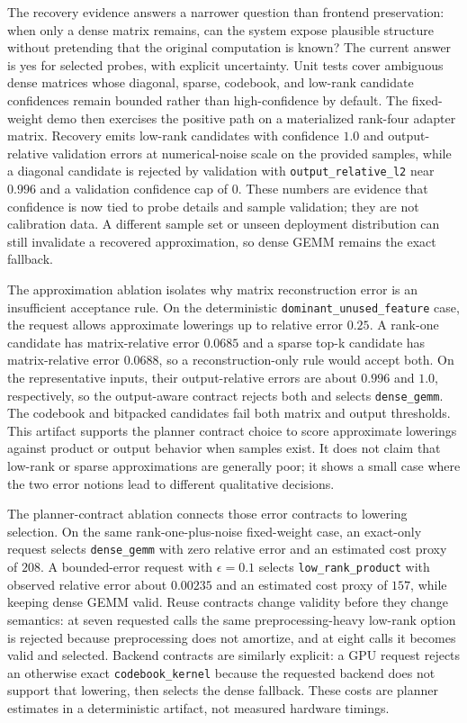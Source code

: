\documentclass[11pt]{article}
\begin{document}
The recovery evidence answers a narrower question than frontend preservation:
when only a dense matrix remains, can the system expose plausible structure
without pretending that the original computation is known? The current answer
is yes for selected probes, with explicit uncertainty. Unit tests cover
ambiguous dense matrices whose diagonal, sparse, codebook, and low-rank
candidate confidences remain bounded rather than high-confidence by default.
The fixed-weight demo then exercises the positive path on a materialized
rank-four adapter matrix. Recovery emits low-rank candidates with confidence
$1.0$ and output-relative validation errors at numerical-noise scale on the
provided samples, while a diagonal candidate is rejected by validation with
\texttt{output\_relative\_l2} near $0.996$ and a validation confidence cap of
$0$. These numbers are evidence that confidence is now tied to probe details
and sample validation; they are not calibration data. A different sample set or
unseen deployment distribution can still invalidate a recovered approximation,
so dense GEMM remains the exact fallback.

The approximation ablation isolates why matrix reconstruction error is an
insufficient acceptance rule. On the deterministic
\texttt{dominant\_unused\_feature} case, the request allows approximate
lowerings up to relative error $0.25$. A rank-one candidate has matrix-relative
error $0.0685$ and a sparse top-k candidate has matrix-relative error $0.0688$,
so a reconstruction-only rule would accept both. On the representative inputs,
their output-relative errors are about $0.996$ and $1.0$, respectively, so the
output-aware contract rejects both and selects \texttt{dense\_gemm}. The
codebook and bitpacked candidates fail both matrix and output thresholds. This
artifact supports the planner contract choice to score approximate lowerings
against product or output behavior when samples exist. It does not claim that
low-rank or sparse approximations are generally poor; it shows a small case
where the two error notions lead to different qualitative decisions.

The planner-contract ablation connects those error contracts to lowering
selection. On the same rank-one-plus-noise fixed-weight case, an exact-only
request selects \texttt{dense\_gemm} with zero relative error and an estimated
cost proxy of $208$. A bounded-error request with $\epsilon=0.1$ selects
\texttt{low\_rank\_product} with observed relative error about $0.00235$ and an
estimated cost proxy of $157$, while keeping dense GEMM valid. Reuse contracts
change validity before they change semantics: at seven requested calls the
same preprocessing-heavy low-rank option is rejected because preprocessing does
not amortize, and at eight calls it becomes valid and selected. Backend
contracts are similarly explicit: a GPU request rejects an otherwise exact
\texttt{codebook\_kernel} because the requested backend does not support that
lowering, then selects the dense fallback. These costs are planner estimates in
a deterministic artifact, not measured hardware timings.
\end{document}
